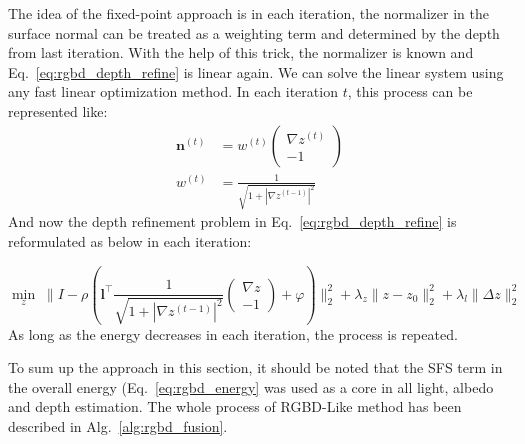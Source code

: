 The idea of the fixed-point approach is in each iteration, the normalizer in the surface normal can be treated as a weighting term and determined by the depth from last iteration.
With the help of this trick, the normalizer is known and Eq.~\ref{eq:rgbd_depth_refine} is linear again.
We can solve the linear system using any fast linear optimization method.
In each iteration $t$, this process can be represented like:
\begin{equation}
	\begin{split}
		\mathbf{n}^{(t)} &= w^{(t)}
		\begin{pmatrix} 
			 \nabla z^{(t)}\\ 
			 -1
	         \end{pmatrix}\\
	         w^{(t)} &=  \frac{1}{\sqrt{1 + |\nabla z^{(t-1)}|^2}}
	\end{split}
\end{equation}
And now the depth refinement problem in Eq.~\ref{eq:rgbd_depth_refine} is reformulated as below in each iteration:

\begin{equation}\label{eq:rgbd_depth_refine2}
	\min_{z} \; \lVert I - \rho (\mathbf{l}^\top \frac{1}{\sqrt{1 + |\nabla z^{(t-1)}|^2}} \begin{pmatrix} \nabla z\\ -1 \end{pmatrix} + \varphi) \rVert^2_2 + \lambda_z \lVert z - z_0\rVert^2_2 + \lambda_l \lVert \Delta z \rVert^2_2
\end{equation}
As long as the energy decreases in each iteration, the process is repeated.

To sum up the approach in this section, it should be noted that the SFS term in the overall energy (Eq.~\ref{eq:rgbd_energy} was used as a core in all light, albedo and depth estimation.
The whole process of RGBD-Like method has been described in Alg.~\ref{alg:rgbd_fusion}. 




